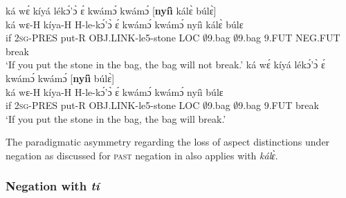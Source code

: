 \begin{exe} 
\ex\label{kale2}
\begin{xlist}
\ex\label{kale2a}
  \glll  ká wɛ́ kíyá lékɔ́'ɔ̀ ɛ́ kwámɔ́ kwámɔ́ [{\bfseries nyíì} kálɛ̀ búlɛ̀]\\
        ká wɛ-H kíya-H H-le-kɔ́'ɔ̀ ɛ́ kwámɔ́ kwámɔ́ nyíì kálɛ̀ búlɛ \\
           if 2\textsc{sg}-PRES put-R OBJ.LINK-le5-stone LOC $\emptyset$9.bag $\emptyset$9.bag 9.FUT NEG.FUT break  \\
    \trans `If you put the stone in the bag, the bag will not break.'
\ex\label{kale2b}
  \glll  ká wɛ́ kíyá lékɔ́'ɔ̀ ɛ́ kwámɔ́ kwámɔ́ [{\bfseries nyíì} búlɛ̀] \\
        ká wɛ-H kíya-H H-le-kɔ́'ɔ̀ ɛ́ kwámɔ́ kwámɔ́ nyíì búlɛ \\
           if 2\textsc{sg}-PRES put-R OBJ.LINK-le5-stone LOC $\emptyset$9.bag $\emptyset$9.bag 9.FUT break  \\
    \trans `If you put the stone in the bag, the bag will break.'
\end{xlist}
\end{exe}

The paradigmatic asymmetry regarding the loss of aspect distinctions under negation as discussed for \textsc{past} negation in  also applies with {\itshape kálɛ̀}.









\subsubsection{Negation with {\itshape tí}}
\label{sec:NEGti}




